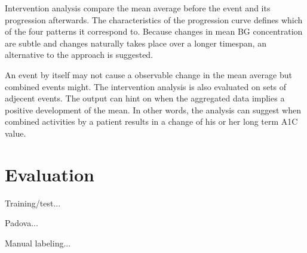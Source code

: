 Intervention analysis compare the mean average before the event and its progression afterwards.
The characteristics of the progression curve defines which of the four patterns it correspond to.
Because changes in mean BG concentration are subtle and changes naturally takes place over a longer timespan, an alternative to the approach is suggested.

An event by itself may not cause a observable change in the mean average but combined events might.
The intervention analysis is also evaluated on sets of adjecent events.
The output can hint on when the aggregated data implies a positive development of the mean.
In other words, the analysis can suggest when combined activities by a patient results in a change of his or her long term A1C value.

\section{Evaluation}

Training/test...

Padova...

Manual labeling...
